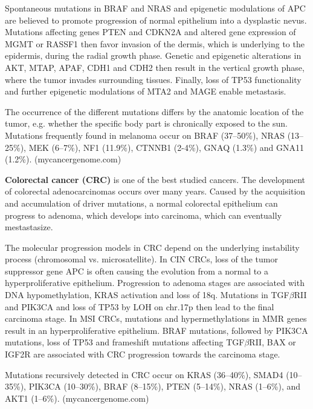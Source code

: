{{      Spontaneous mutations in BRAF and NRAS and epigenetic modulations of APC
      are believed to promote progression of normal epithelium into a dysplastic
      nevus. Mutations affecting genes PTEN and CDKN2A and altered gene
      expression of MGMT or RASSF1 then favor invasion of the dermis, which is
      underlying to the epidermis, during the radial growth phase. Genetic and
      epigenetic alterations in AKT, MTAP, APAF, CDH1 and CDH2 then result in
      the vertical growth phase, where the tumor invades surrounding tissues.
      Finally, loss of TP53 functionality and further epigenetic modulations of
      MTA2 and MAGE enable metastasis. {\cite{melanoma}} {\cite{melanoma_2}}

      The occurrence of the different mutations differs by the anatomic location
      of the tumor, e.g. whether the specific body part is chronically exposed
      to the sun. Mutations frequently found in melanoma occur on BRAF
      (37--50\%), NRAS (13--25\%), MEK (6--7\%), NF1 (11.9\%), CTNNB1 (2-4\%),
      GNAQ (1.3\%) and GNA11 (1.2\%). (mycancergenome.com)

      \textbf{Colorectal cancer (CRC)} is one of the best studied cancers. The
      development of colorectal adenocarcinomas occurs over many years. Caused
      by the acquisition and accumulation of driver mutations, a normal
      colorectal epithelium can progress to adenoma, which develops into
      carcinoma, which can eventually mestastasize.

      The molecular progression models in CRC depend on the underlying
      instability process (chromosomal vs. microsatellite). In CIN CRCs, loss of
      the tumor suppressor gene APC is often causing the evolution from a normal
      to a hyperproliferative epithelium. Progression to adenoma stages are
      associated with DNA hypomethylation, KRAS activation and loss of 18q.
      Mutations in TGF$\beta$RII and PIK3CA and loss of TP53 by LOH on chr.17p
      then lead to the final carcinoma stage. In MSI CRCs, mutations and
      hypermethylations in MMR genes result in an hyperproliferative epithelium.
      BRAF mutations, followed by PIK3CA mutations, loss of TP53 and frameshift
      mutations affecting TGF$\beta$RII, BAX or IGF2R are associated with CRC
      progression towards the carcinoma stage. {\cite{cin_crc}} {\cite{crc}} {\cite{crc_2}}

      Mutations recursively detected in CRC occur on KRAS (36--40\%), SMAD4
      (10--35\%), PIK3CA (10--30\%), BRAF (8--15\%), PTEN (5--14\%), NRAS
      (1--6\%), and  AKT1 (1--6\%). (mycancergenome.com)

}}
